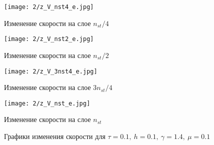 \begin{figure}[h]
	\begin{minipage}[h]{0.47\linewidth}
		\centering
		\texttt{[image: 2/z\_V\_nst4\_e.jpg]} 
		\caption{Изменение скорости на слое $n_{st} / 4$}
	\end{minipage}
	\hfill
	\begin{minipage}[h]{0.47\linewidth}
		\centering
		\texttt{[image: 2/z\_V\_nst2\_e.jpg]} 
		\caption{Изменение скорости на слое $n_{st} / 2$}
	\end{minipage}
	\vfill
	\begin{minipage}[h]{0.47\linewidth}
		\centering
		\texttt{[image: 2/z\_V\_3nst4\_e.jpg]} 
		\caption{Изменение скорости на слое $3n_{st} / 4$}
	\end{minipage}
	\hfill
	\begin{minipage}[h]{0.47\linewidth}
		\centering
		\texttt{[image: 2/z\_V\_nst\_e.jpg]} 
		\caption{Изменение скорости на слое $n_{st}$}
	\end{minipage}
	\caption{Графики изменения скорости для $\tau = 0.1, \ h = 0.1, \ \gamma = 1.4, \ \mu = 0.1$}
	\label{ris:experimentalcorrelationsignals}
\end{figure}